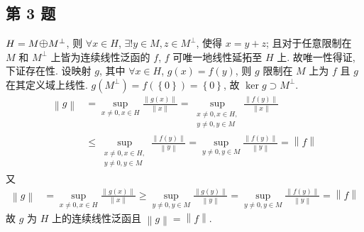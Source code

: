 \documentclass[../main.tex]{subfiles}
\begin{document}
\subsection{第 3 题}
$H = M \mathlarger{\mathlarger{\oplus}} M^\bot$,
则 $\forall x \in H$, $\exists! y \in M, z \in M^\bot$, 使得 $x = y + z$;
且对于任意限制在 $M$ 和 $M^\bot$ 上皆为连续线性泛函的 $f$, $f$ 可唯一地线性延拓至 $H$ 上.
故唯一性得证, 下证存在性.
设映射 $g$, 其中 $\forall x \in H$, $g \left( x \right) = f \left( y \right)$, 则 $g$ 限制在 $M$ 上为 $f$ 且 $g$ 在其定义域上线性.
$g \left( M^\bot \right) = f \left( \left\{ 0 \right\} \right) = \left\{ 0 \right\}$, 故 $\ker g \supset M^\bot$.
\begin{align*}
    \left\| g \right\|
    &=
    \sup_{x \neq 0, x \in H}
    \frac{\left\| g \left( x \right) \right\|}{\left\| x \right\|}
    =
    \sup_{\substack{x \neq 0, x \in H, \\ y \neq 0, y \in M}}
    \frac{\left\| f \left( y \right) \right\|}{\left\| x \right\|} \\
    &\leqslant
    \sup_{\substack{x \neq 0, x \in H, \\ y \neq 0, y \in M}}
    \frac{\left\| f \left( y \right) \right\|}{\left\| y \right\|}
    =
    \sup_{y \neq 0, y \in M}
    \frac{\left\| f \left( y \right) \right\|}{\left\| y \right\|}
    = \left\| f \right\|
\end{align*}
又
\begin{align*}
    \left\| g \right\|
    &=
    \sup_{x \neq 0, x \in H}
    \frac{\left\| g \left( x \right) \right\|}{\left\| x \right\|}
    \geqslant
    \sup_{y \neq 0, y \in M}
    \frac{\left\| g \left( y \right) \right\|}{\left\| y \right\|}
    =
    \sup_{y \neq 0, y \in M}
    \frac{\left\| f \left( y \right) \right\|}{\left\| y \right\|}
    =
    \left\| f \right\|
\end{align*}
故 $g$ 为 $H$ 上的连续线性泛函且 $\left\| g \right\| = \left\| f \right\|$.
\end{document}
